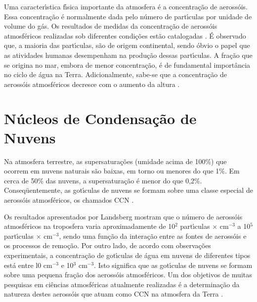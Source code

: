 Uma caracter\'{\i}stica f\'{\i}sica importante da atmosfera \'{e} a concentra\c{c}\~{a}o de aeross\'{o}is. Essa concentra\c{c}\~{a}o \'{e} normalmente dada pelo n\'{u}mero de part\'{\i}culas por unidade de volume do g\'{a}s. Os resultados de medidas da concentra\c{c}\~{a}o de aeross\'{o}is atmosf\'{e}ricos realizadas sob diferentes condi\c{c}\~{o}es est\~{a}o catalogadas \cite{Junge}. \'{E} observado que, a maioria das part\'{\i}culas, s\~{a}o de origem continental, sendo \'{o}bvio o papel que as atividades humanas desempenham na produ\c{c}\~{a}o dessas part\'{\i}culas.  A fra\c{c}\~{a}o que se origina no mar, embora de menor concentra\c{c}\~{a}o, \'{e} de fundamental import\^{a}ncia no ciclo de \'{a}gua na Terra. Adicionalmente, sabe-se que a concentra\c{c}\~{a}o de aeross\'{o}is atmosf\'{e}ricos decresce com o aumento da altura \cite{Junge}.

\section{N\'{u}cleos de Condensa\c{c}\~{a}o de Nuvens}

Na atmosfera terrestre, as supersatura\c{c}\~{o}es (umidade acima de 100\%) que ocorrem em nuvens naturais s\~{a}o baixas, em torno ou menores do que 1\%. Em cerca de 50\% das nuvens, a supersatura\c{c}\~{a}o \'{e} menor do que 0,2\%. Conseq\"{u}entemente, as got\'{\i}culas de nuvens se formam sobre uma classe especial de aeross\'{o}is atmosf\'{e}ricos, os chamados CCN \cite{Mendes}.

Os resultados apresentados por Landsberg \cite{Mendes} mostram que o n\'{u}mero de aeross\'{o}is atmosf\'{e}ricos na troposfera varia aproximadamente de 10$^2$ part\'{\i}culas $\times$ cm$^{-3}$ a 10$^5$ part\'{\i}culas $\times$ cm$^{-3}$, sendo uma fun\c{c}\~{a}o da intera\c{c}\~{a}o entre as fontes de aeross\'{o}is e os processos de remo\c{c}\~{a}o.  Por outro lado, de acordo com observa\c{c}\~{o}es experimentais, a concentra\c{c}\~{a}o de got\'{\i}culas de \'{a}gua em nuvens de diferentes tipos est\'{a} entre l0 cm$^{-3}$ e 10$^3$ cm$^{-3}$. Isto significa que as got\'{\i}culas de nuvens se formam sobre uma pequena fra\c{c}\~{a}o dos aeross\'{o}is atmosf\'{e}ricos. Um dos objetivos de muitas pesquisas em ci\^{e}ncias atmosf\'{e}ricas atualmente realizadas \'{e} a determina\c{c}\~{a}o da natureza destes aeross\'{o}is que atuam como CCN na atmosfera da Terra \cite{Mason}.

